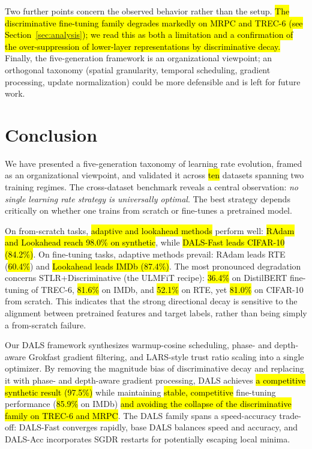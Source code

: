 \documentclass[a4paper,fleqn]{cas-dc}
\begin{document}
Two further points concern the observed behavior rather than the setup. \hl{The discriminative fine-tuning family degrades markedly on MRPC and TREC-6 (see Section~\mbox{\ref{sec:analysis}}); we read this as both a limitation and a confirmation of the over-suppression of lower-layer representations by discriminative decay.} Finally, the five-generation framework is an organizational viewpoint; an orthogonal taxonomy (spatial granularity, temporal scheduling, gradient processing, update normalization) could be more defensible and is left for future work.

\section{Conclusion}\label{sec:conclusion}

We have presented a five-generation taxonomy of learning rate evolution, framed as an organizational viewpoint, and validated it across \hl{ten} datasets spanning two training regimes. The cross-dataset benchmark reveals a central observation: \emph{no single learning rate strategy is universally optimal}. The best strategy depends critically on whether one trains from scratch or fine-tunes a pretrained model.

On from-scratch tasks, \hl{adaptive and lookahead methods} perform well: \hl{RAdam and Lookahead reach 98.0\% on synthetic}, while \hl{DALS-Fast leads CIFAR-10 (84.2\%)}. On fine-tuning tasks, adaptive methods prevail: RAdam leads RTE (\hl{60.4\%}) and \hl{Lookahead leads IMDb (87.4\%)}. The most pronounced degradation concerns STLR+Discriminative (the ULMFiT recipe): \hl{36.4\%} on DistilBERT fine-tuning of TREC-6, \hl{81.6\%} on IMDb, and \hl{52.1\%} on RTE, yet \hl{81.0\%} on CIFAR-10 from scratch. This indicates that the strong directional decay is sensitive to the alignment between pretrained features and target labels, rather than being simply a from-scratch failure.

Our DALS framework synthesizes warmup-cosine scheduling, phase- and depth-aware Grokfast gradient filtering, and LARS-style trust ratio scaling into a single optimizer. By removing the magnitude bias of discriminative decay and replacing it with phase- and depth-aware gradient processing, DALS achieves \hl{a competitive synthetic result (97.5\%)} while maintaining \hl{stable, competitive} fine-tuning performance (\hl{85.9\%} on IMDb) \hl{and avoiding the collapse of the discriminative family on TREC-6 and MRPC}. The DALS family spans a speed-accuracy trade-off: DALS-Fast converges rapidly, base DALS balances speed and accuracy, and DALS-Acc incorporates SGDR restarts for potentially escaping local minima.
\end{document}
